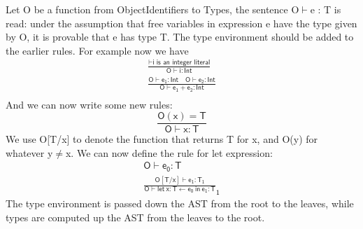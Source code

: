Let O be a function from ObjectIdentifiers to Types, the sentence O$\vdash$e : T is read: under the assumption that free variables in expression e have the type given by O, it is provable that e has type T. The type environment should be added to the earlier rules. For example now we have
\begin{gather*}
\mathsf{\frac{\vdash\text{i is an integer literal}}{O\vdash i:Int}}\\
\mathsf{\frac{O\vdash e_1:Int\quad O\vdash e_2 :Int}{O\vdash e_1+e_2:Int}}\\
\end{gather*}
And we can now write some new rules:
\begin{equation*}
\mathsf{\frac{O(x) = T}{O\vdash x : T}}
\end{equation*}
We use O[T/x] to denote the function that returns T for x, and O(y) for whatever y$\neq$x. We can now define the rule for {\sf let} expression:
\begin{gather}
\mathsf{O\vdash e_0: T}\nonumber\\
\mathsf{\frac{O[T/x]\vdash e_1:T_1}{O\vdash let\:x:T\leftarrow e_0\:in\:e_1:T}_1}\label{oldlet}
\end{gather}
The type environment is passed down the AST from the root to the leaves, while types are computed up the AST from the leaves to the root.
